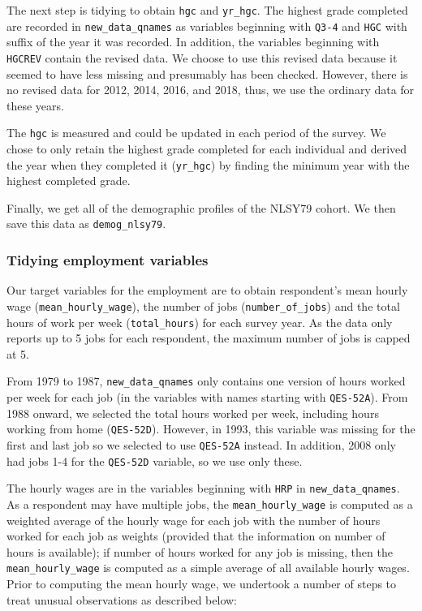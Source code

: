 \documentclass{article}
\begin{document}
The next step is tidying to obtain \texttt{hgc} and \texttt{yr\_hgc}. The highest grade completed are recorded in \texttt{new\_data\_qnames} as variables beginning with \texttt{Q3-4} and \texttt{HGC} with suffix of the year it was recorded. In addition, the variables beginning with \texttt{HGCREV} contain the revised data. We choose to use this revised data because it seemed to have less missing and presumably has been checked. However, there is no revised data for 2012, 2014, 2016, and 2018, thus, we use the ordinary data for these years.

The \texttt{hgc} is measured and could be updated in each period of the survey. We chose to only retain the highest grade completed for each individual and derived the year when they completed it (\texttt{yr\_hgc}) by finding the minimum year with the highest completed grade.

Finally, we get all of the demographic profiles of the NLSY79 cohort. We then save this data as \texttt{demog\_nlsy79}.

\hypertarget{tidyemp}{%
\subsubsection{Tidying employment variables}\label{tidyemp}}

Our target variables for the employment are to obtain respondent's mean hourly wage (\texttt{mean\_hourly\_wage}), the number of jobs (\texttt{number\_of\_jobs}) and the total hours of work per week (\texttt{total\_hours}) for each survey year. As the data only reports up to 5 jobs for each respondent, the maximum number of jobs is capped at 5.

From 1979 to 1987, \texttt{new\_data\_qnames} only contains one version of hours worked per week for each job (in the variables with names starting with \texttt{QES-52A}). From 1988 onward, we selected the total hours worked per week, including hours working from home (\texttt{QES-52D}). However, in 1993, this variable was missing for the first and last job so we selected to use \texttt{QES-52A} instead. In addition, 2008 only had jobs 1-4 for the \texttt{QES-52D} variable, so we use only these.

The hourly wages are in the variables beginning with \texttt{HRP} in \texttt{new\_data\_qnames}. As a respondent may have multiple jobs, the \texttt{mean\_hourly\_wage} is computed as a weighted average of the hourly wage for each job with the number of hours worked for each job as weights (provided that the information on number of hours is available); if number of hours worked for any job is missing, then the \texttt{mean\_hourly\_wage} is computed as a simple average of all available hourly wages. Prior to computing the mean hourly wage, we undertook a number of steps to treat unusual observations as described below:
\end{document}

